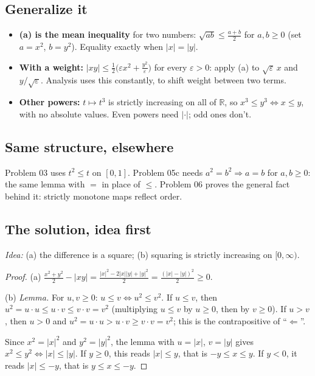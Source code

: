 \documentclass{kaelearn}
\begin{document}
\subsection{Generalize it}
\begin{itemize}
  \item \textbf{(a) is the mean inequality}  for two numbers: $\sqrt{ab}\le\frac{a+b}{2}$
        for $a,b\ge0$ (set $a=x^2$, $b=y^2$). Equality exactly when $|x|=|y|$.
  \item \textbf{With a weight:} $|xy|\le\frac12\bigl(\varepsilon x^2+\frac{y^2}{\varepsilon}\bigr)$ for every
        $\varepsilon>0$: apply (a) to $\sqrt{\varepsilon}\,x$ and $y/\sqrt{\varepsilon}$. Analysis uses this
        constantly, to shift weight between two terms.
  \item \textbf{Other powers:} $t\mapsto t^3$ is strictly increasing on all of $\mathbb{R}$, so $x^3\le y^3
        \Leftrightarrow x\le y$, with no absolute values. Even powers need $|\cdot|$; odd ones don't.
\end{itemize}

\subsection{Same structure, elsewhere}
Problem 03 uses $t^2\le t$ on $[0,1]$. Problem 05c needs $a^2=b^2\Rightarrow a=b$ for $a,b\ge0$: the same lemma with
$=$ in place of $\le$. Problem 06 proves the general fact behind it: strictly monotone maps reflect order.



\subsection{The solution, idea first}
\emph{Idea:} (a) the difference is a square; (b) squaring is strictly increasing on $[0,\infty)$.
\begin{proof}
(a) $\frac{x^2+y^2}{2}-|xy|=\frac{|x|^2-2|x||y|+|y|^2}{2}=\frac{(|x|-|y|)^2}{2}\ge0$.

(b) \emph{Lemma.} For $u,v\ge0$: $u\le v\Leftrightarrow u^2\le v^2$. If $u\le v$, then $u^2=u\cdot u\le u\cdot v\le
v\cdot v=v^2$ (multiplying $u\le v$ by $u\ge0$, then by $v\ge0$). If $u>v$, then $u>0$ and $u^2=u\cdot u>u\cdot v\ge
v\cdot v=v^2$; this is the contrapositive of ``$\Leftarrow$''.

Since $x^2=|x|^2$ and $y^2=|y|^2$, the lemma with $u=|x|$, $v=|y|$ gives $x^2\le y^2\Leftrightarrow|x|\le|y|$. If
$y\ge0$, this reads $|x|\le y$, that is $-y\le x\le y$. If $y<0$, it reads $|x|\le-y$, that is $y\le x\le-y$.
\end{proof}
\end{document}

